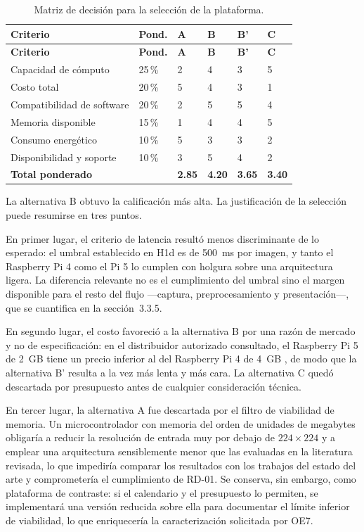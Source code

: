\begin{longtable}{L{4.2cm}L{1.5cm}L{1.6cm}L{1.6cm}L{1.6cm}L{1.6cm}}
\caption{Matriz de decisión para la selección de la plataforma.}
\label{tab:decision} \\
\toprule
\textbf{Criterio} & \textbf{Pond.} & \textbf{A} & \textbf{B} & \textbf{B'} & \textbf{C} \\
\midrule
\endfirsthead
\toprule
\textbf{Criterio} & \textbf{Pond.} & \textbf{A} & \textbf{B} & \textbf{B'} & \textbf{C} \\
\midrule
\endhead
Capacidad de cómputo & 25\,\% & 2 & 4 & 3 & 5 \\
Costo total & 20\,\% & 5 & 4 & 3 & 1 \\
Compatibilidad de software & 20\,\% & 2 & 5 & 5 & 4 \\
Memoria disponible & 15\,\% & 1 & 4 & 4 & 5 \\
Consumo energético & 10\,\% & 5 & 3 & 3 & 2 \\
Disponibilidad y soporte & 10\,\% & 3 & 5 & 4 & 2 \\
\midrule
\textbf{Total ponderado} & & \textbf{2.85} & \textbf{4.20} & \textbf{3.65} & \textbf{3.40} \\
\bottomrule
\end{longtable}

La alternativa B obtuvo la calificación más alta. La justificación de la
selección puede resumirse en tres puntos.

En primer lugar, el criterio de latencia resultó menos discriminante de lo
esperado: el umbral establecido en H1d es de 500~ms por imagen, y tanto el
Raspberry Pi 4 como el Pi 5 lo cumplen con holgura sobre una arquitectura
ligera. La diferencia relevante no es el cumplimiento del umbral sino el
margen disponible para el resto del flujo —captura, preprocesamiento y
presentación—, que se cuantifica en la sección~3.3.5.

En segundo lugar, el costo favoreció a la alternativa B por una razón de
mercado y no de especificación: en el distribuidor autorizado consultado, el
Raspberry Pi 5 de 2~GB tiene un precio inferior al del Raspberry Pi 4 de
4~GB \citep{ohms2026}, de modo que la alternativa B' resulta a la vez más
lenta y más cara. La alternativa C quedó descartada por presupuesto antes de
cualquier consideración técnica.

En tercer lugar, la alternativa A fue descartada por el filtro de viabilidad
de memoria. Un microcontrolador con memoria del orden de unidades de
megabytes obligaría a reducir la resolución de entrada muy por debajo de
$224\times224$ y a emplear una arquitectura sensiblemente menor que las
evaluadas en la literatura revisada, lo que impediría comparar los resultados
con los trabajos del estado del arte y comprometería el cumplimiento de
RD-01. Se conserva, sin embargo, como plataforma de contraste: si el
calendario y el presupuesto lo permiten, se implementará una versión reducida
sobre ella para documentar el límite inferior de viabilidad, lo que
enriquecería la caracterización solicitada por OE7.

